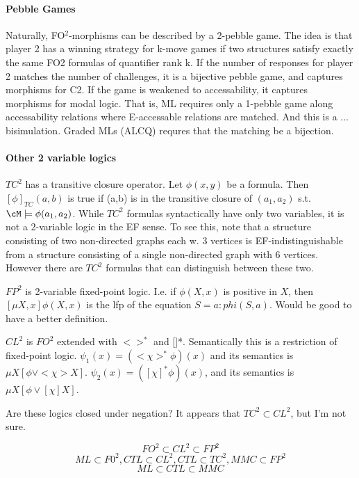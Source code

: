 \paragraph{Pebble Games}
Naturally, FO$^2$-morphisms can be described by a 2-pebble game.  The
idea is that player 2 has a winning strategy for k-move games if two
structures satisfy exactly the same FO2 formulas of quantifier rank k.
If the number of responses for player 2 matches the number of
challenges, it is a bijective pebble game, and captures morphisms for
C2.  If the game is weakened to accessability, it captures morphisms
for modal logic.  That is, ML requires only a 1-pebble game along
accessability relations where E-accessable relations are matched.  And
this is a ... bisimulation.  Graded MLs (ALCQ) requres that the
matching be a bijection.

\paragraph{Other 2 variable logics}
$TC^2$ has a transitive closure operator.  Let $\phi(x,y)$ be a
formula.  Then $[\phi]_{TC}(a,b)$ is true if (a,b) is in the
transitive closure of $(a_1,a_2)$ s.t. $\cM \models \phi(a_1,a_2)$.
While $TC^2$ formulas syntactically have only two variables, it is not
a 2-variable logic in the EF sense.  To see this, note that a
structure consisting of two non-directed graphs each w. 3 vertices is
EF-indistinguishable from a structure consisting of a single
non-directed graph with 6 vertices.  However there are $TC^2$ formulas
that can distinguish between these two.

$FP^2$ is 2-variable fixed-point logic.  I.e. if $\phi(X,x)$ is
positive in $X$, then $[\mu X,x]\phi(X,x)$ is the lfp of the equation
$S = a:phi(S,a)$.  Would be good to have a better definition.

$CL^2$ is $FO^2$ extended with $<>^*$ and []*.  Semantically this is a
restriction of fixed-point logic.  $\psi_1(x) = (<\chi>^*\phi)(x)$ and
its semantics is $\mu X [ \phi \vee <\chi>X]$.  $\psi_2(x) =
([\chi]^*\phi)(x)$, and its semantics is $\mu X [ \phi \vee [\chi]X]$.

Are these logics closed under negation?  It appears that $TC^2 \subset
CL^2$, but I'm not sure.

\[ FO^2 \subset CL^2 \subset FP^2 \]
\[ML \subset F0^2, CTL \subset CL^2, CTL \subset TC^2, MMC \subset FP^2 \]
\[ ML \subset CTL \subset MMC \]

